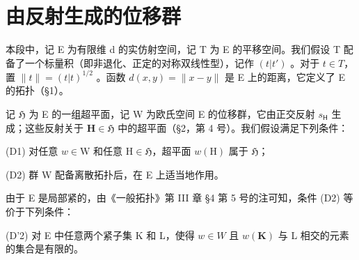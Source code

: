 \section{由反射生成的位移群}

本段中，记 E 为有限维 d 的实仿射空间，记 T 为 E 的平移空间。我们假设 T 配备了一个标量积（即非退化、正定的对称双线性型），记作 \((t|t')\) 。对于 \(t \in T\)，置 \(\|t\| = (t|t)^{1/2}\) 。函数 \(d(x, y) = \|x - y\|\) 是 E 上的距离，它定义了 E 的拓扑（§1）。

记 \(\mathfrak{H}\) 为 E 的一组超平面，记 W 为欧氏空间 E 的位移群，它由正交反射 \(s_{\mathsf{H}}\) 生成；这些反射关于 \(\mathbf{H} \in \mathfrak{H}\) 中的超平面（§2，第 4 号）。我们假设满足下列条件：

(D1) 对任意 \(w \in \mathrm{W}\) 和任意 \(\mathrm{H} \in \mathfrak{H}\)，超平面 \(w(\mathrm{H})\) 属于 \(\mathfrak{H}\)；

(D2) 群 W 配备离散拓扑后，在 E 上适当地作用。

由于 E 是局部紧的，由《一般拓扑》第 III 章 §4 第 5 号的注可知，条件 (D2) 等价于下列条件：

(D'2) 对 E 中任意两个紧子集 K 和 L，使得 \(w \in W\) 且 \(w(\mathbf{K})\) 与 L 相交的元素的集合是有限的。

